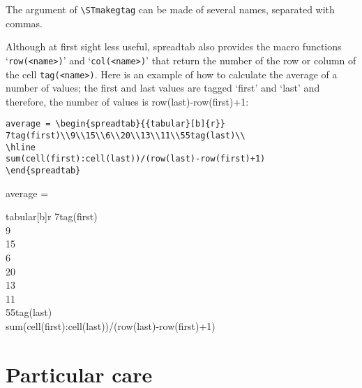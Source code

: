 \documentclass[a4paper,10pt]{article}
\newcommand\verbinline[1][]{\lstinline[breaklines=false,basicstyle=\normalsize\ttfamily,#1]}
\newcommand\ST{\textsf{spreadtab}\xspace}
\begin{document}
\begin{<table environment>}
The argument of \verbinline-\STmakegtag- can be made of several names, separated with commas.

Although at first sight less useful, \ST also provides the macro functions `\verbinline-row(<name>)-' and `\verbinline-col(<name>)-' that return the number of the row or column of the cell \verbinline-tag(<name>)-. Here is an example of how to calculate the average of a number of values; the first and last values are tagged `first' and `last' and therefore, the number of values is row(last)-row(first)+1:

\begin{minipage}{0.6\linewidth}
\begin{lstlisting}
average = \begin{spreadtab}{{tabular}[b]{r}}
7tag(first)\\9\\15\\6\\20\\13\\11\\55tag(last)\\
\hline
sum(cell(first):cell(last))/(row(last)-row(first)+1)
\end{spreadtab}
\end{lstlisting}
\end{minipage}\hfill
\begin{minipage}{0.35\linewidth}
average = \begin{spreadtab}{{tabular}[b]{r}}
7tag(first)\\9\\15\\6\\20\\13\\11\\55tag(last)\\
\hline
sum(cell(first):cell(last))/(row(last)-row(first)+1)
\end{spreadtab}
\end{minipage}

\section{Particular care}

\end{<table environment>}
\end{document}
